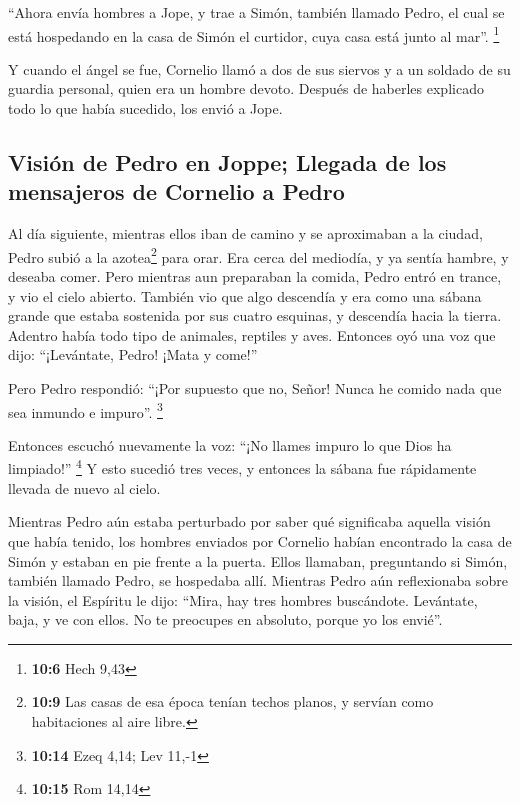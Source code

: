  ``Ahora envía hombres a Jope, y trae a Simón, también
llamado Pedro,  el cual se está hospedando en la casa de
Simón el curtidor, cuya casa está junto al mar''. \footnote{\textbf{10:6}
  Hech 9,43}

 Y cuando el ángel se fue, Cornelio llamó a dos de sus
siervos y a un soldado de su guardia personal, quien era un hombre
devoto.  Después de haberles explicado todo lo que había
sucedido, los envió a Jope.

\hypertarget{visiuxf3n-de-pedro-en-joppe-llegada-de-los-mensajeros-de-cornelio-a-pedro}{%
\subsection{Visión de Pedro en Joppe; Llegada de los mensajeros de
Cornelio a
Pedro}\label{visiuxf3n-de-pedro-en-joppe-llegada-de-los-mensajeros-de-cornelio-a-pedro}}

 Al día siguiente, mientras ellos iban de camino y se
aproximaban a la ciudad, Pedro subió a la azotea\footnote{\textbf{10:9}
  Las casas de esa época tenían techos planos, y servían como
  habitaciones al aire libre.} para orar. Era cerca del mediodía,
 y ya sentía hambre, y deseaba comer. Pero mientras aun
preparaban la comida, Pedro entró en trance,  y vio el
cielo abierto. También vio que algo descendía y era como una sábana
grande que estaba sostenida por sus cuatro esquinas, y descendía hacia
la tierra.  Adentro había todo tipo de animales, reptiles
y aves.  Entonces oyó una voz que dijo: ``¡Levántate,
Pedro! ¡Mata y come!''

 Pero Pedro respondió: ``¡Por supuesto que no, Señor!
Nunca he comido nada que sea inmundo e impuro''. \footnote{\textbf{10:14}
  Ezeq 4,14; Lev 11,-1}

 Entonces escuchó nuevamente la voz: ``¡No llames impuro
lo que Dios ha limpiado!'' \footnote{\textbf{10:15} Rom 14,14}
 Y esto sucedió tres veces, y entonces la sábana fue
rápidamente llevada de nuevo al cielo.

 Mientras Pedro aún estaba perturbado por saber qué
significaba aquella visión que había tenido, los hombres enviados por
Cornelio habían encontrado la casa de Simón y estaban en pie frente a la
puerta.  Ellos llamaban, preguntando si Simón, también
llamado Pedro, se hospedaba allí.  Mientras Pedro aún
reflexionaba sobre la visión, el Espíritu le dijo: ``Mira, hay tres
hombres buscándote.  Levántate, baja, y ve con ellos. No
te preocupes en absoluto, porque yo los envié''.

